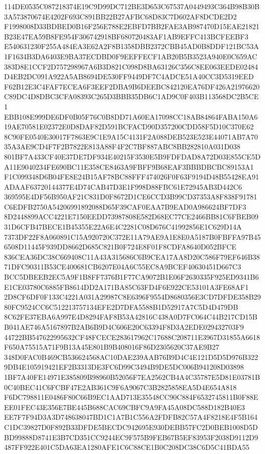 \documentclass[UTF8,fontset=fandol,zihao=-4,a4paper]{ctexart}
\begin{document}
{{114DE0535C087218374E19C9D99DC712BE3D653C67537A0449493C364B98B30B3A573870674E4202F693C891BB22B27AFBC68D83C7D602AF8DCDE2D2
F1998008D33BDBED0B16F256E788E2EBFD7BB2FAE3AB987470D15EAE21821B23E47EA59B8FE954F306742918BF680720483AF1AB9EFFC413BCFEEBF3
E540631230F255A484EA3E62A2F8B1358DBB2372CBB45AD0B8DDF121BC53A1F1634B3DA6403E9BA37ECDBD0F9EEFFECF1AB20B5B3523A940E0C659AC
383D8E1CCF2D757298967A6B3D821C098D8BA63126C356C8EE063EEDE02484D4EB2DC091A922A5AB8694DE530FF9449DF7C4ADCE51A40CC3D5319EED
F62B12E3C4FAF7ECEA6F3EEF2DBA9B6DEEBC842120EA76DF426A21976620C89DC4D8DBC3CFA08393C265D3BBB35DB6C1AD9C0F403B113568DC2B5CE1
EBB108E999DE6DF0B05F76C0B8DD71A60EA17098CC18AB84864FABA150A619AE70581E02372E0D8DAF82D591BCFACD90D357200CDD58F5D10C370E62
8C90FE0540E30017F7863E9C1E9A15C4131F2A088DEB523E523E44071AB7A7035A3AE9CD4F7F2B7822E813A88F4F2C7BF887ABC8BB282810A031D038
801BF7A433CF40E37DE7DF934E40215F3530E5B9FDFDAD8A72D03E855CE5DA11E9040234FE690BC11E358CE8463A9FBFF9B68EAF3BBBDBCBC89153A1
F1C099348D6B04FE8E24B15AF78BC88FFF474026F0F63F9194D48B55428EA91ADAAF63720144377E4D74CAB47D3E1F998D88FBC61E72945AB3D442C6
369595E4DF56B950AF21C831D0F8672D1CE6CCD3B99CD37353A8F838F91781C6EDFB2750A54206991892088D65F39CAF0EAA7B9EAD0A986624BF7DF3
8D2448899ACC4221E7150EEDD73987808E582D68EC77CE2466BB81C6FBEB0931D6CFB47BECE1B45355E22A6E4C2281C08D676C41992856E1C629D14A
7373DF22F8A060891C15A920720C372E11A79AE9A1E8E0A5187B0FBFFA97B456508D11445F939DD8662D685C821B0F724E8F01F8CDFA8640D052BFCE
836CEA36DC38C669408C11A43A315686C6B9CEA17AA8D20C586F79EF646B3871DFC90311B53CE400681CB6207E04A6C55EC8A9BCEF40630451D667C3
BCC5DBEEB2EC5A9F1B8FF7376B1F77CA9072B1E06F2630335F925ED9341B6E1CE03780C6885FB8614DD2A171BA85C63FD4F6E922CE53101A3FE68AF1
2D8CF6DF0F133C4221A031A29987C8E6396F9554D8680356E3CD7DFDE358B2980FC9524CC6C512213757134EFE2D7DFA5588B1D52917A7C5D4D479DB
8C62FE37EBA6A997E4D8294FAF8B53A42816C438A0D7FC064C44B217CD15BB041AE746A5167897B2AB6B9D4C606E20C63394F8D3A2EDE029432703F9
44722BB547622995632CF48FCECE283617962C17688C208711E3967D31855A6618F650A75515A71F9B13A45E801B9B408016F86D2305620C37AE9B27
348D0FAC0B469CB536624568AC10DAE239AAB76B9D4C4E121D5D5D976B3229DB4E105919421EF2B3313DE3FC6D99C3494B9DE5DC006B941208D03898
1BF7A40FE14971E385809B98960B52056F7EA2562CB4A4C35787E5D81E03781B0C40BEC41C6FCBF47E2AB361C9F6A9067C3B2825858EA5D4E654A818
F6DC798811E0486F80C66B9EC1AAD713E35548CC90C884F6532745811B0F88EEE01FEC43E356E7BE445B688CAC69CBFC9A9FA45A08DC588D182B40E3
EE7F7F94D3A3D748638047BD1C1A7B1C556A2FDFB82C57A4F8218E4F5B164C1DC39827D0F892B33DFDE5BECDC942695E930DEBB57FC2D0BEB1008D5D
BD99888D8741E3B7CD351CC9244EC9F575B9FEB67B5EF83953F2038D9112D9487FF922E401C5DA63EA1280AFE1C6C88CE1B0C208DC38C6D5C41BDA55
}}
\end{document}
